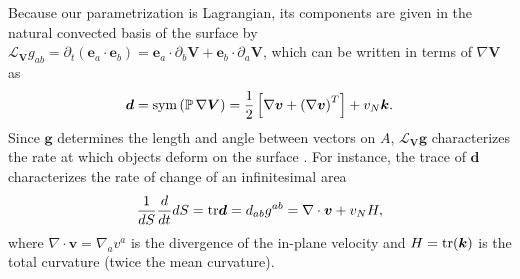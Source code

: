 Because our parametrization is Lagrangian, its components are given in the natural convected basis of the surface by $\mathcal{L}_{\bm{V}}g_{ab} = \partial_t\left(\bm{e}_a\cdot\bm{e}_b\right)=\bm{e}_a\cdot\partial_b\bm{V} + \bm{e}_b\cdot\partial_a\bm{V}$, which can be written in terms of $\nabla\bm{V}$ as
\begin{equation}
	\label{eq6:d}
	\bm{d} = {\rm sym}\left(\mathbb{P}\,\nabla \bm{V}\right)= \frac{1}{2}\left[\nabla \bm{v} + \left(\nabla\bm{v}\right)^T\right] + v_N \bm{k}.
\end{equation}
Since $\bm{g}$ determines the length and angle between vectors on $A$, $\mathcal{L}_{\bm{V}}\bm{g}$ characterizes the rate at which objects deform on the surface \cite{torres2017}. For instance, the trace of $\bm{d}$ characterizes the rate of change of an infinitesimal area
\begin{equation}\label{eq6:dSdt}
	\frac{1}{dS}\dfrac{d}{dt}dS = \textup{tr}\bm{d} = d_{ab}g^{ab} = \nabla \cdot \bm{v} + v_N H,
\end{equation}
where $\nabla \cdot \bm{v}=\nabla_a v^a$ is the divergence of the in-plane velocity and $H=\textup{tr}(\bm{k})$ is the total curvature (twice the mean curvature).

